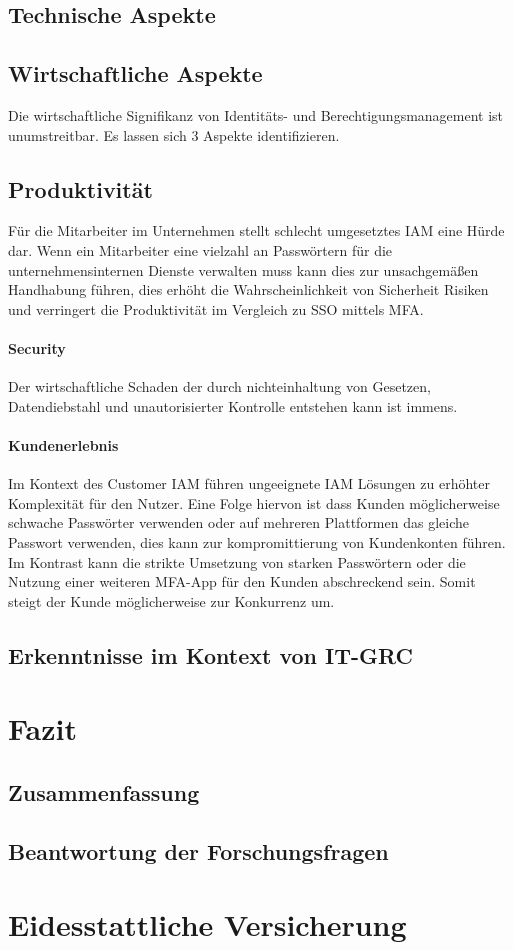 \documentclass[10pt]{article}
\begin{document}
\subsection{Technische Aspekte}
\subsection{Wirtschaftliche Aspekte}
Die wirtschaftliche Signifikanz von Identitäts- und Berechtigungsmanagement ist unumstreitbar. Es lassen sich 3 Aspekte identifizieren.
\subsection{Produktivität}
Für die Mitarbeiter im Unternehmen stellt schlecht umgesetztes IAM eine Hürde dar. Wenn ein Mitarbeiter eine vielzahl an Passwörtern für die unternehmensinternen Dienste verwalten muss kann dies zur unsachgemäßen Handhabung führen, dies erhöht die Wahrscheinlichkeit von Sicherheit Risiken und verringert die Produktivität im Vergleich zu SSO mittels MFA.~\cite{azhar2014economics}
\paragraph{Security}
Der wirtschaftliche Schaden der durch nichteinhaltung von Gesetzen, Datendiebstahl und unautorisierter Kontrolle entstehen kann ist immens.~\cite{azhar2014economics}
\paragraph{Kundenerlebnis}
Im Kontext des Customer IAM führen ungeeignete IAM Lösungen zu erhöhter Komplexität für den Nutzer. Eine Folge hiervon ist dass Kunden möglicherweise schwache Passwörter verwenden oder auf mehreren Plattformen das gleiche Passwort verwenden, dies kann zur kompromittierung von Kundenkonten führen. Im Kontrast kann die strikte Umsetzung von starken Passwörtern oder die Nutzung einer weiteren MFA-App für den Kunden abschreckend sein. Somit steigt der Kunde möglicherweise zur Konkurrenz um.~\cite{azhar2014economics}
\subsection{Erkenntnisse im Kontext von IT-GRC}
\section{Fazit}
\subsection{Zusammenfassung}
\subsection{Beantwortung der Forschungsfragen}
\section{Eidesstattliche Versicherung}
\newpage
\printbibliography[notkeyword={quelle}, title={Literaturverzeichnis}]
\newpage
\printbibliography[keyword={quelle}, title={Quellenverzeichnis}]
\newpage
\listoffigures
\end{document}
